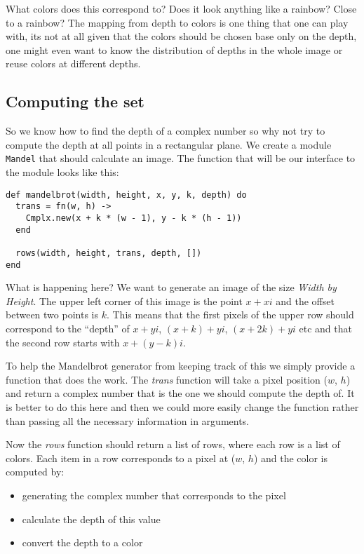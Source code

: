 \documentclass[a4paper,11pt]{article}
\begin{document}
What colors does this correspond to? Does it look anything like a
rainbow? Close to a rainbow? The mapping from depth to colors is one
thing that one can play with, its not at all given that the colors
should be chosen base only on the depth, one might even want to know
the distribution of depths in the whole image or reuse colors at
different depths.


\subsection{Computing the set}

So we know how to find the depth of a complex number so why not try to
compute the depth at all points in a rectangular plane. We create a
module {\tt Mandel} that should calculate an image. The function that
will be our interface to the module looks like this:

\begin{verbatim}
def mandelbrot(width, height, x, y, k, depth) do
  trans = fn(w, h) ->
    Cmplx.new(x + k * (w - 1), y - k * (h - 1))
  end

  rows(width, height, trans, depth, [])
end
\end{verbatim}

What is happening here? We want to generate an image of the size {\em
  Width by Height}. The upper left corner of this image is the point $x
+ xi$ and the offset between two points is $k$. This means that the
first pixels of the upper row should correspond to the ``depth'' of
$x+yi$, $(x+k) + yi$, $(x+2k) + yi$ etc and that the second row starts
with $x + (y-k)i$. 

To help the Mandelbrot generator from keeping track of this we simply
provide a function that does the work. The {\em trans} function will
take a pixel position ($w$, $h$) and return a complex number that is
the one we should compute the depth of. It is better to do this here
and then we could more easily change the function rather than passing
all the necessary information in arguments.

Now the {\em rows} function should return a list of rows, where each
row is a list of colors. Each item in a row corresponds to a pixel at
($w$, $h$) and the color is computed by:

\begin{itemize}
 \item generating the complex number that corresponds to the pixel
 \item calculate the depth of this value
 \item convert the depth to a color
\end{itemize}
\end{document}
